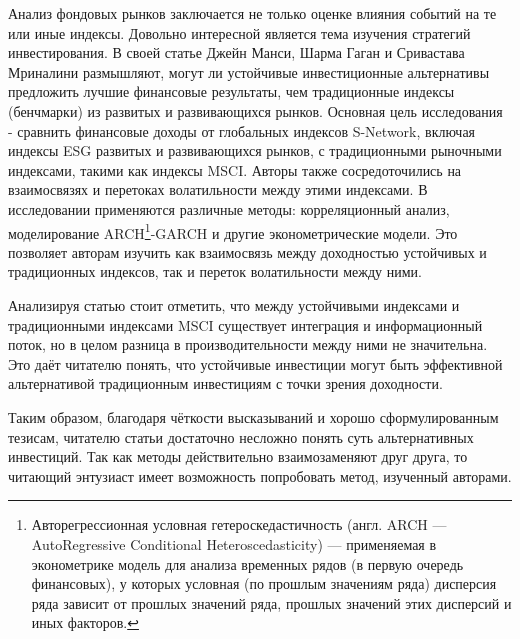 \documentclass[14pt]{extarticle}
\begin{document}
Анализ фондовых рынков заключается не только оценке влияния событий на те или иные индексы. Довольно интересной является тема изучения стратегий инвестирования. В своей статье Джейн Манси, Шарма Гаган и Сривастава Мриналини\cite{risks7010015} размышляют, могут ли устойчивые инвестиционные альтернативы предложить лучшие финансовые результаты, чем традиционные индексы (бенчмарки) из развитых и развивающихся рынков. Основная цель исследования - сравнить финансовые доходы от глобальных индексов S-Network, включая индексы ESG развитых и развивающихся рынков, с традиционными рыночными индексами, такими как индексы MSCI. Авторы также сосредоточились на взаимосвязях и перетоках волатильности между этими индексами. В исследовании применяются различные методы: корреляционный анализ, моделирование ARCH\footnote{Авторегрессионная условная гетероскедастичность (англ. ARCH — AutoRegressive Conditional Heteroscedasticity) — применяемая в эконометрике модель для анализа временных рядов (в первую очередь финансовых), у которых условная (по прошлым значениям ряда) дисперсия ряда зависит от прошлых значений ряда, прошлых значений этих дисперсий и иных факторов.}-GARCH и другие эконометрические модели. Это позволяет авторам изучить как взаимосвязь между доходностью устойчивых и традиционных индексов, так и переток волатильности между ними.

Анализируя статью стоит отметить, что между устойчивыми индексами и традиционными индексами MSCI существует интеграция и информационный поток, но в целом разница в производительности между ними не значительна. Это даёт читателю понять, что устойчивые инвестиции могут быть эффективной альтернативой традиционным инвестициям с точки зрения доходности.

Таким образом, благодаря чёткости высказываний и хорошо сформулированным тезисам, читателю статьи достаточно несложно понять суть альтернативных инвестиций. Так как методы действительно взаимозаменяют друг друга, то читающий энтузиаст имеет возможность попробовать метод, изученный авторами.
\end{document}
